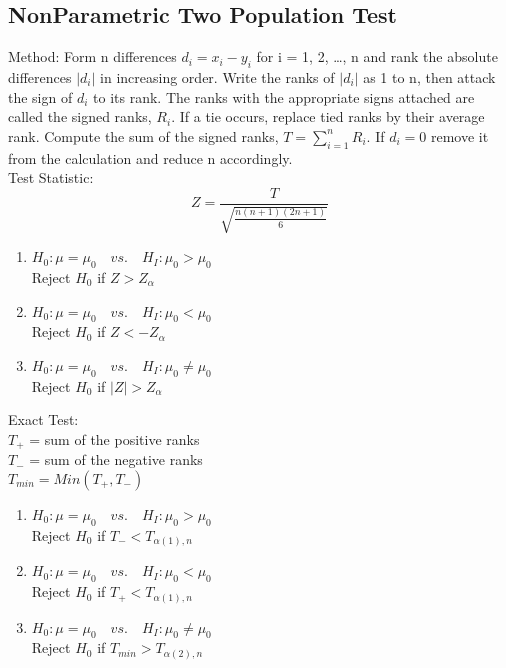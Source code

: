 \documentclass[10pt]{article}
\newcommand{\iSum}[2]{\sum_{i= #1}^{#2}}
\newcommand{\abs}[1]{\lvert#1\rvert}
\begin{document}
\begin{multicols}{2}
\section*{NonParametric Two Population Test}
Method: Form n differences $d_{i}=x_{i}-y_{i}$ for i = 1, 2, \ldots, n and rank the absolute differences $\abs{d_{i}}$ in increasing order.  Write the ranks of $\abs{d_{i}}$ as 1 to n, then attack the sign of $d_{i}$ to its rank.  The ranks with the appropriate signs attached are called the signed ranks, $R_{i}$.  If a tie occurs, replace tied ranks by their average rank.  Compute the sum of the signed ranks, $T = \iSum{1}{n}R_{i}$.  If $d_{i} = 0$ remove it from the calculation and reduce n accordingly.\\
Test Statistic:\\
$$Z = \frac{T}{\sqrt{\frac{n(n+1)(2n+1)}{6}}}$$
\begin{enumerate}
	\item $H_{0}:\mu=\mu_{0}\quad vs. \quad H_{I}:\mu_{0}>\mu_{0}$
	\\Reject $H_{0}$ if $Z > Z_{\alpha}$
	\item $H_{0}:\mu=\mu_{0}\quad vs. \quad H_{I}:\mu_{0}<\mu_{0}$
	\\Reject $H_{0}$ if $Z < -Z_{\alpha}$
	\item $H_{0}:\mu=\mu_{0}\quad vs. \quad H_{I}:\mu_{0}\neq\mu_{0}$
	\\Reject $H_{0}$ if $\abs{Z} > Z_{\alpha}$
\end{enumerate}
Exact Test: 
	\\$T_{+}$ = sum of the positive ranks
	\\$T_{-}$ = sum of the negative ranks
	\\$T_{min} = Min(T_{+}, T_{-})$
\begin{enumerate}
	\item $H_{0}:\mu=\mu_{0}\quad vs. \quad H_{I}:\mu_{0}>\mu_{0}$
	\\Reject $H_{0}$ if $T_{-} < T_{\alpha(1), n}$
	\item $H_{0}:\mu=\mu_{0}\quad vs. \quad H_{I}:\mu_{0}<\mu_{0}$
	\\Reject $H_{0}$ if $T_{+} < T_{\alpha(1), n}$
	\item $H_{0}:\mu=\mu_{0}\quad vs. \quad H_{I}:\mu_{0}\neq\mu_{0}$
	\\Reject $H_{0}$ if $T_{min} > T_{\alpha(2), n}$
\end{enumerate}


\end{multicols}
\end{document}

